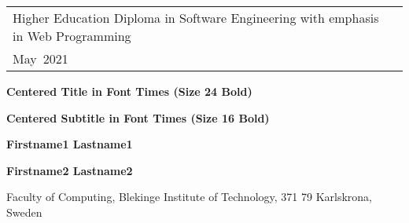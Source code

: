 \documentclass[a4paper,twoside]{bth}
\newcommand{\thesisDegree}{Higher Education Diploma in Software Engineering with emphasis in Web Programming}
\newcommand{\thesisMonth}{May}
\newcommand{\thesisYear}{2021}
\newcommand{\faculty}{Computing}
\newcommand{\thesisTitle}{Centered Title in Font Times (Size 24 Bold)}
\newcommand{\thesisSubtitle}{Centered Subtitle in Font Times (Size 16 Bold)}
\newcommand{\authorFirst}{Firstname1 Lastname1}
\newcommand{\authorSecond}{Firstname2 Lastname2}
\begin{document}
\pagestyle{plain}

{\pagestyle{empty}
\changepage{3cm}{1cm}{-0.5cm}{-0.5cm}{}{-1.5cm}{}{}{}
\noindent
\begin{tabular}{@{}p{} p{}}
\thesisDegree & \hfill\multirow{3}{*}{\bthcsnotextlogo{3cm}} \\
\thesisMonth \ \thesisYear & \\
\end{tabular}

\center
\vspace {7.5cm}
{\Huge\textbf{\thesisTitle}}

\vspace {0.5cm}
{\Large\textbf{\thesisSubtitle}}

\vspace{2cm}
{\Large\textbf{\authorFirst}}

\vspace{0.3cm}
{\Large\textbf{\authorSecond}}

\vspace*{\fill}

\noindent\makebox[\linewidth]{\rule{\textwidth}{1pt}}
Faculty of \faculty, Blekinge Institute of Technology, 371 79 Karlskrona, Sweden

\clearpage
} %
\end{document}
